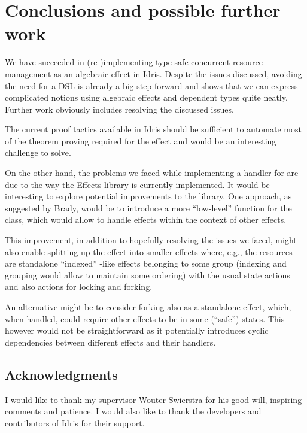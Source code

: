 \section{Conclusions and possible further work}

We have succeeded in (re-)implementing type-safe concurrent resource
management as an algebraic effect in Idris. Despite the issues discussed,
avoiding the need for a DSL is already a big step forward and shows that we can
express complicated notions using algebraic effects and dependent types quite
neatly. Further work obviously includes resolving the discussed issues.

The current proof tactics available in Idris should be sufficient to automate
most of the theorem proving required for the  effect and would
be an interesting challenge to solve.

On the other hand, the problems we faced while implementing a handler for
 are due to the way the Effects library is currently implemented. It
would be interesting to explore potential improvements to the library. One
approach, as suggested by Brady, would be to introduce a more ``low-level''
 function for the  class, which would allow to
handle effects within the context of other effects.

This improvement, in addition to hopefully resolving the issues we faced, might
also enable splitting up the  effect into smaller effects
where, e.g., the resources are standalone ``indexed'' -like effects
belonging to some group (indexing and grouping would allow to maintain some
ordering) with the usual state actions and also actions for locking and forking.

An alternative might be to consider forking also as a standalone effect, which,
when handled, could require other effects to be in some (``safe'') states.
This however would not be straightforward as it potentially introduces
cyclic dependencies between different effects and their handlers.

\subsection*{Acknowledgments}

I would like to thank my supervisor Wouter Swierstra for his good-will,
inspiring comments and patience. I would also like to thank the developers and
contributors of Idris for their support.
